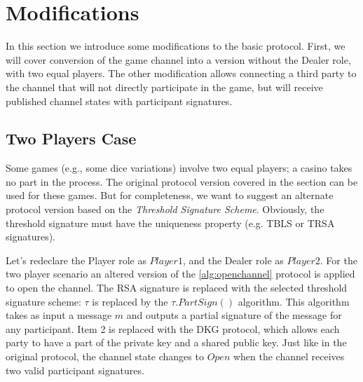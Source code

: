 \section{Modifications}
In this section we introduce some modifications to the basic protocol. First, we will cover conversion of the game channel into a version without the Dealer role, with two equal players. The other modification allows connecting a third party to the channel that will not directly participate in the game, but will receive published channel states with participant signatures. 

\subsection{Two Players Case}
Some games (e.g., some dice variations) involve two equal players; a casino takes no part in the process. The original protocol version covered in the  section can be used for these games. But for completeness, we want to suggest an alternate protocol version based on the  \textit {Threshold Signature Scheme}. Obviously, the threshold signature must have the uniqueness property (e.g. TBLS or TRSA \cite{bib23} signatures).

Let’s redeclare the Player role as $Player1$, and the Dealer role as $Player2$. For the two player scenario an altered version of the \autoref{alg:openchannel} protocol is applied to open the channel. The RSA signature is replaced with the selected threshold signature scheme: $ \tau $ is replaced by the $\tau.PartSign()$ algorithm. This algorithm takes as input a message $m$ and outputs a partial signature of the message for any participant. Item 2 is replaced with the DKG protocol, which allows each party to have a part of the private key and a shared public key. Just like in the original protocol, the channel state changes to $Open$ when the channel receives two valid participant signatures. 

